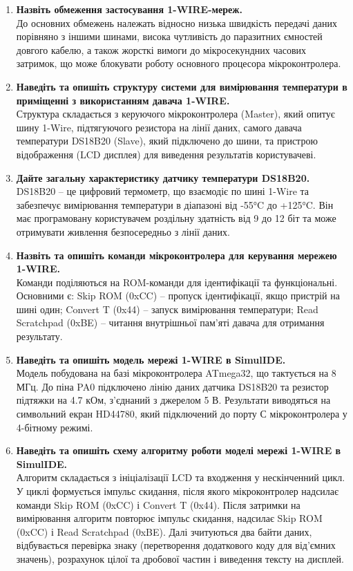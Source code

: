 \documentclass[14pt, a4paper]{extreport}
\begin{document}
\begin{enumerate}
		\item \textbf{Назвіть обмеження застосування 1-WIRE-мереж.} \\ До основних обмежень належать відносно низька швидкість передачі даних порівняно з іншими шинами, висока чутливість до паразитних ємностей довгого кабелю, а також жорсткі вимоги до мікросекундних часових затримок, що може блокувати роботу основного процесора мікроконтролера.
		
		\item \textbf{Наведіть та опишіть структуру системи для вимірювання температури в приміщенні з використанням давача 1-WIRE.} \\ Структура складається з керуючого мікроконтролера (Master), який опитує шину 1-Wire, підтягуючого резистора на лінії даних, самого давача температури DS18B20 (Slave), який підключено до шини, та пристрою відображення (LCD дисплея) для виведення результатів користувачеві.
		
		\item \textbf{Дайте загальну характеристику датчику температури DS18B20.} \\ DS18B20 -- це цифровий термометр, що взаємодіє по шині 1-Wire та забезпечує вимірювання температури в діапазоні від -55°C до +125°C. Він має програмовану користувачем роздільну здатність від 9 до 12 біт та може отримувати живлення безпосередньо з лінії даних.
		
		\item \textbf{Назвіть та опишіть команди мікроконтролера для керування мережею 1-WIRE.} \\ Команди поділяються на ROM-команди для ідентифікації та функціональні. Основними є: Skip ROM (0xCC) -- пропуск ідентифікації, якщо пристрій на шині один; Convert T (0x44) -- запуск вимірювання температури; Read Scratchpad (0xBE) -- читання внутрішньої пам'яті давача для отримання результату.
		
		\item \textbf{Наведіть та опишіть модель мережі 1-WIRE в SimulIDE.} \\ Модель побудована на базі мікроконтролера ATmega32, що тактується на 8 МГц. До піна PA0 підключено лінію даних датчика DS18B20 та резистор підтяжки на 4.7 кОм, з'єднаний з джерелом 5 В. Результати виводяться на символьний екран HD44780, який підключений до порту С мікроконтролера у 4-бітному режимі.
		
		\item \textbf{Наведіть та опишіть схему алгоритму роботи моделі мережі 1-WIRE в SimulIDE.} \\ Алгоритм складається з ініціалізації LCD та входження у нескінченний цикл. У циклі формується імпульс скидання, після якого мікроконтролер надсилає команди Skip ROM (0xCC) і Convert T (0x44). Після затримки на вимірювання алгоритм повторює імпульс скидання, надсилає Skip ROM (0xCC) і Read Scratchpad (0xBE). Далі зчитуються два байти даних, відбувається перевірка знаку (перетворення додаткового коду для від'ємних значень), розрахунок цілої та дробової частин і виведення тексту на дисплей.
		

\end{enumerate}
\end{document}
